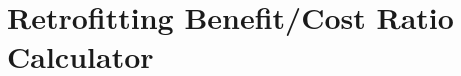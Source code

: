 \documentclass[11pt,a4paper,headings=small,dvips]{scrbook}
\begin{document}
\chapter{Retrofitting Benefit/Cost Ratio Calculator}
	\label{chap:bcr}
	
%	
%	
%	
%	
\end{document}
